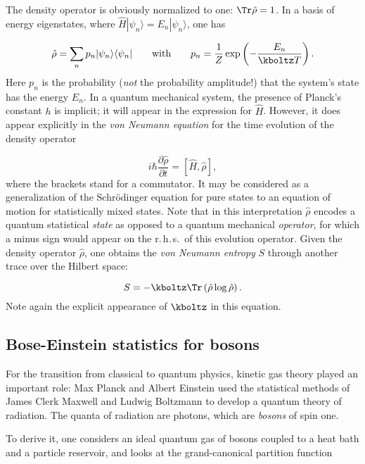 \documentclass{scrartcl}
\begin{document}
The density operator is obviously normalized to one: $\Tr \hat \rho=1$. In a basis of energy eigenstates, where $\hat H |\psi_n\rangle=E_n  |\psi_n\rangle$, one has

\begin{equation*}
  \hat \rho=\sum_n p_n |\psi_n\rangle \langle \psi_n|
    \qquad \textrm{with} \qquad
    p_n=\frac{1}{Z} \exp\left(-\frac{E_n}{\kboltz T}\right).
\end{equation*}
%
Here $p_n$ is the probability (\emph{not} the probability amplitude!) that the system's state has the energy $E_n$. In a quantum mechanical system, the presence of Planck's constant $h$ is implicit; it will appear in the expression for $\hat H$. However, it does appear explicitly in the \emph{von Neumann equation} for the time evolution of the density operator

\begin{equation*}\label{eq:vNeumann}
  i \hbar \frac{\partial \hat \rho}{\partial t}=\left[\hat H, \hat \rho\right],
\end{equation*}
%
where the brackets stand for a commutator. It may be considered as a generalization of the Schrödinger equation for pure states to an equation of motion for statistically mixed states. Note that in this interpretation $\hat \rho$ encodes a quantum statistical \emph{state} as opposed to a quantum mechanical \emph{operator}, for which a minus sign would appear on the r.\,h.\,s.\ of this evolution operator. Given the density operator $\hat \rho$, one obtains the \emph{von Neumann entropy} $S$ through another trace over the Hilbert space:

\begin{equation*}
  S=-\kboltz \Tr \left( \hat \rho \log \hat \rho \right).
\end{equation*}
%
Note again the explicit appearance of $\kboltz$ in this equation.


\subsection*{Bose-Einstein statistics for bosons}

For the transition from classical to quantum physics, kinetic gas theory played an important role: Max Planck and Albert Einstein used the statistical methods of James Clerk Maxwell and Ludwig Boltzmann to develop a quantum theory of radiation. The quanta of radiation are photons, which are \emph{bosons} of spin one.

To derive it, one considers an ideal quantum gas of bosons coupled to a heat bath and a particle reservoir, and looks at the grand-canonical partition function
\end{document}
